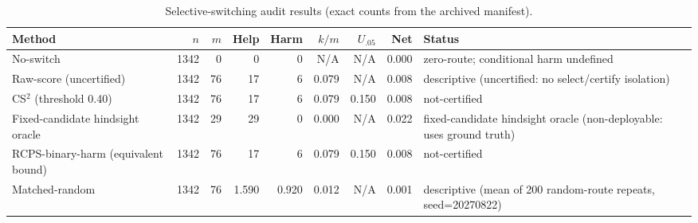\begin{table}[t]
\centering
\caption{Selective-switching audit results (exact counts from the archived manifest).}
\label{tab:cs2_main}
\begin{tabular}{lrrrrrrrl}
\toprule
Method & $n$ & $m$ & Help & Harm & $k/m$ & $U_{.05}$ & Net & Status \\
\midrule
No-switch & 1342 & 0 & 0 & 0 & N/A & N/A & 0.000 & zero-route; conditional harm undefined \\
Raw-score (uncertified) & 1342 & 76 & 17 & 6 & 0.079 & N/A & 0.008 & descriptive (uncertified: no select/certify isolation) \\
CS$^2$ (threshold 0.40) & 1342 & 76 & 17 & 6 & 0.079 & 0.150 & 0.008 & not-certified \\
Fixed-candidate hindsight oracle & 1342 & 29 & 29 & 0 & 0.000 & N/A & 0.022 & fixed-candidate hindsight oracle (non-deployable: uses ground truth) \\
RCPS-binary-harm (equivalent bound) & 1342 & 76 & 17 & 6 & 0.079 & 0.150 & 0.008 & not-certified \\
Matched-random & 1342 & 76 & 1.590 & 0.920 & 0.012 & N/A & 0.001 & descriptive (mean of 200 random-route repeats, seed=20270822) \\
\bottomrule
\end{tabular}
\end{table}
